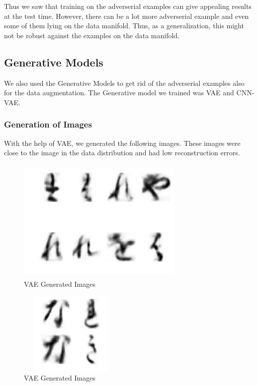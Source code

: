 \documentclass[11pt]{article}
\begin{document}
Thus we saw that training on the adverserial examples can give appealing results at the test time. However, there can be a lot more adverserial example and even some of them lying on the data manifold. Thus, as a generalization, this might not be robust against the examples on the data manifold. 
\subsection{Generative Models}
We also used the Generative Models to get rid of the adverserial examples also for the data augmentation. The Generative model we trained was VAE and CNN-VAE. 

\subsubsection{Generation of Images}
With the help of VAE, we generated the following images. These images were close to the image in the data distribution and had low reconstruction errors.

\begin{center}
        \begin{figure}[!h]
        \centering
          \includegraphics[width=80mm, height=60mm]{1.png}
          \caption{ VAE Generated Images
          }
          \label{fig:Piston}
        \end{figure}
\end{center}
\begin{center}
        \begin{figure}[!h]
        \centering
          \includegraphics[width=50mm, height=40mm]{2.png}
          \caption{ VAE Generated Images
          }
          \label{fig:Piston}
        \end{figure}
\end{center}
\end{document}

